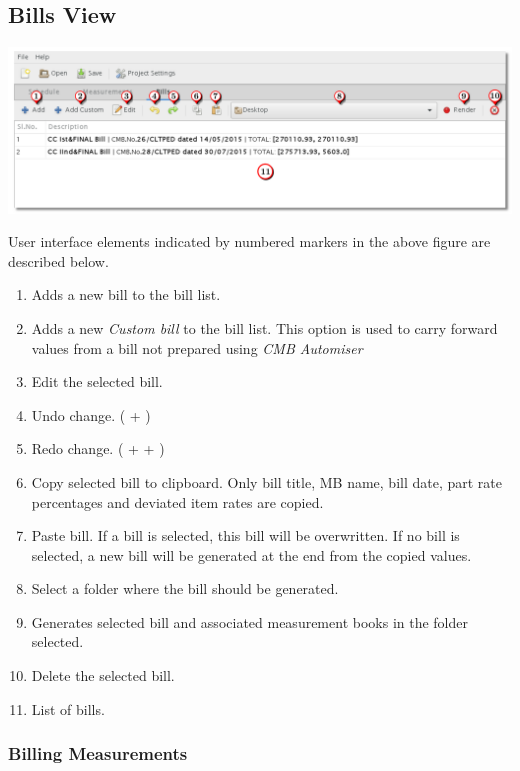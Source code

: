 \documentclass[twoside,a4paper]{refart}
\begin{document}
	 \subsection{Bills View}
	 
	 \begin{maxipage}
	 	\includegraphics[width=1\linewidth]{screenshots/window_bill.png}
	 \end{maxipage}
	 
	 User interface elements indicated by numbered markers in the above figure are described below.
	 
	 \begin{enumerate}
	 	\item Adds a new bill to the bill list.
	 	\item Adds a new \emph{Custom bill} to the bill list. This option is used to carry forward values from a bill not prepared using \emph{CMB Automiser}
	 	\item Edit the selected bill.
	 	\item Undo change. ( + )
	 	\item Redo change. ( +  + )	 
	 	\item Copy selected bill to clipboard. Only bill title, MB name, bill date, part rate percentages and deviated item rates are copied.
	 	\item Paste bill. If a bill is selected, this bill will be overwritten. If no bill is selected, a new bill will be generated at the end from the copied values.
	 	\item Select a folder where the bill should be generated.
	 	\item Generates selected bill and associated measurement books in the folder selected.
	 	\item Delete the selected bill.
	 	\item List of bills.
	 \end{enumerate}
	 
	 \subsubsection{Billing Measurements}
	 
\end{document}
